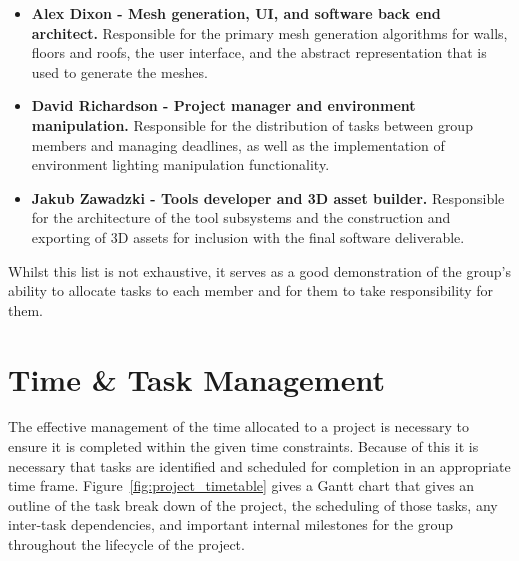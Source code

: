     \begin{itemize}
        \item \textbf{Alex Dixon - Mesh generation, UI, and software back end architect.} Responsible for the primary mesh generation algorithms for walls, floors and roofs, the user interface, and the abstract representation that is used to generate the meshes.
        \item \textbf{David Richardson - Project manager and environment manipulation.} Responsible for the distribution of tasks between group members and managing deadlines, as well as the implementation of environment lighting manipulation functionality.
        \item \textbf{Jakub Zawadzki - Tools developer and 3D asset builder.} Responsible for the architecture of the tool subsystems and the construction and exporting of 3D assets for inclusion with the final software deliverable.
    \end{itemize}
    
    Whilst this list is not exhaustive, it serves as a good demonstration of the group's ability to allocate tasks to each member and for them to take responsibility for them.

\section{Time \& Task Management}

    The effective management of the time allocated to a project is necessary to ensure it is completed within the given time constraints. Because of this it is necessary that tasks are identified and scheduled for completion in an appropriate time frame. Figure~\ref{fig:project_timetable} gives a Gantt chart that gives an outline of the task break down of the project, the scheduling of those tasks, any inter-task dependencies, and important internal milestones for the group throughout the lifecycle of the project.
    
